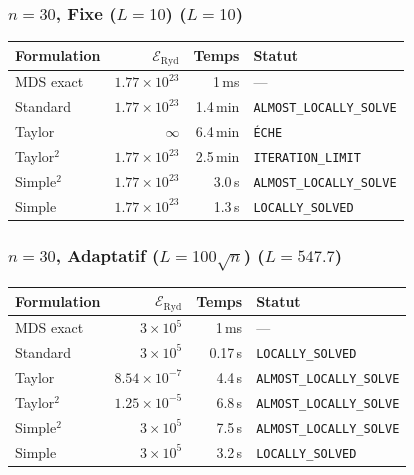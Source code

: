 \subsubsection{$n=30$, Fixe ($L{=}10$) ($L=10$)}
\begin{longtable}{@{}lrrl@{}}
  \toprule
  Formulation & $\mathcal{E}_{\mathrm{Ryd}}$ & Temps & Statut \\
  \midrule
  \endhead
  MDS exact & $1.77\times10^{23}$ & 1\,ms & --- \\
  Standard & $1.77\times10^{23}$ & 1.4\,min & \texttt{ALMOST\_LOCALLY\_SOLVE} \\
  Taylor & $\infty$ & 6.4\,min & \texttt{ÉCHE} \\
  Taylor$^2$ & $1.77\times10^{23}$ & 2.5\,min & \texttt{ITERATION\_LIMIT} \\
  Simple$^2$ & $1.77\times10^{23}$ & 3.0\,s & \texttt{ALMOST\_LOCALLY\_SOLVE} \\
  Simple & $1.77\times10^{23}$ & 1.3\,s & \texttt{LOCALLY\_SOLVED} \\
  \bottomrule
\end{longtable}

\subsubsection{$n=30$, Adaptatif ($L{=}100\sqrt{n}$) ($L=547.7$)}
\begin{longtable}{@{}lrrl@{}}
  \toprule
  Formulation & $\mathcal{E}_{\mathrm{Ryd}}$ & Temps & Statut \\
  \midrule
  \endhead
  MDS exact & $3\times10^{5}$ & 1\,ms & --- \\
  Standard & $3\times10^{5}$ & 0.17\,s & \texttt{LOCALLY\_SOLVED} \\
  Taylor & $8.54\times10^{-7}$ & 4.4\,s & \texttt{ALMOST\_LOCALLY\_SOLVE} \\
  Taylor$^2$ & $1.25\times10^{-5}$ & 6.8\,s & \texttt{ALMOST\_LOCALLY\_SOLVE} \\
  Simple$^2$ & $3\times10^{5}$ & 7.5\,s & \texttt{ALMOST\_LOCALLY\_SOLVE} \\
  Simple & $3\times10^{5}$ & 3.2\,s & \texttt{LOCALLY\_SOLVED} \\
  \bottomrule
\end{longtable}

